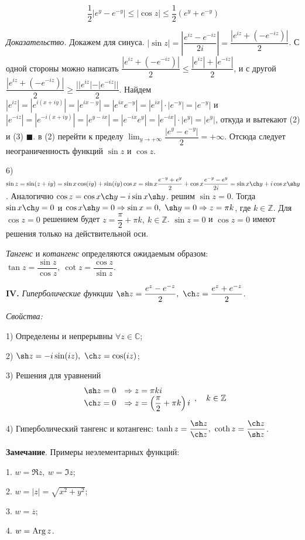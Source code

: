 \documentclass[9pt]{article}
\begin{document}
\begin{equation}
    \frac{1}{2}|e^y-e^{-y}|\le|\cos z|\le\frac{1}{2}(e^y+e^{-y})
\end{equation}
\par\textit{Доказательство.} Докажем для синуса. \(|\sin z|=\left|\dfrac{e^{iz}-e^{-iz}}{2i}\right|=\dfrac{|e^{iz}+(-e^{-iz})|}{2}\). С одной стороны можно написать \(\dfrac{|e^{iz}+(-e^{-iz})|}{2}\le\dfrac{|e^{iz}|+|e^{-iz}|}{2}\), и с другой \(\dfrac{|e^{iz}+(-e^{-iz})|}{2}\ge\dfrac{||e^{iz}|-|e^{-iz}||}{2}\). Найдем \(|e^{iz}|=|e^{i(x+iy)}|=|e^{ix-y}|=|e^{ix}e^{-y}|=|e^{ix}|\cdot|e^{-y}|=|e^{-y}|\) и \(|e^{-iz}|=|e^{-i(x+iy)}|=|e^{y-ix}|=|e^{-ix}e^{y}|=|e^{-ix}|\cdot|e^{y}|=|e^{y}|\), откуда и вытекают (2) и (3) \(\blacksquare\).
 в (2) перейти к пределу \(\displaystyle\lim_{y\to+\infty}\dfrac{|e^y-e^{-y}|}{2}=+\infty\). Отсюда следует неограниченность функций \(\sin z\) и \(\cos z\).
\par6) \(\sin z = \sin(z+iy)=\sin x\cos(iy)+\sin(iy)\cos x=\sin x\dfrac{e^{-y}+e^y}{2}+\cos x\dfrac{e^{-y}-e^y}{2i}=\sin x \ch y + i\cos x \sh y\). Аналогично \(\cos z=\cos x \ch y -i\sin x \sh y\). 
 решим \(\sin z = 0\). Тогда \(\sin x \ch y=0\) и \(\cos x \sh y=0 \Rightarrow \sin x=0,\ \sh y=0\Rightarrow z=\pi k\), где \(k\in\mathbb Z\). Для \(\cos z=0\) решением будет \(z=\dfrac{\pi}{2}+\pi k,\ k\in\mathbb Z\).
 \(\sin z = 0\) и \(\cos z = 0\) имеют решения только на действительной оси.
\par\textit{Тангенс} и \textit{котангенс} определяются ожидаемым образом: \(\tan z=\dfrac{\sin z}{\cos z},\ \cot z = \dfrac{\cos z}{\sin z}\).
\par\textbf{IV.} \textit{Гиперболические функции} \(\sh z = \dfrac{e^z-e^{-z}}{2},\ \ch z = \dfrac{e^z+e^{-z}}{2}\).
\par\textit{Свойства:}
\par1) Определены и непрерывны \(\forall z\in\mathbb C\);
\par2) \(\sh z = -i\sin(iz),\ \ch z = \cos(iz)\);
\par3) Решения для уравнений
\[\begin{array}{ll}
    \sh z = 0 & \Rightarrow z = \pi k i\\
    \ch z = 0 & \Rightarrow z = \left(\dfrac{\pi}{2}+\pi k\right)i
\end{array},\quad k\in\mathbb Z\]
\par4) Гиперболический тангенс и котангенс: \(\tanh z = \dfrac{\sh z}{\ch z},\ \coth z=\dfrac{\ch z}{\sh z}\).
\par\textbf{Замечание}. Примеры неэлементарных функций:
\par1. \(w=\Re z,\ w = \Im z\);
\par2. \(w=|z|=\sqrt{x^2+y^2}\);
\par3. \(w=\overline z\);
\par4. \(w = \operatorname{Arg} z\).
\end{document}
